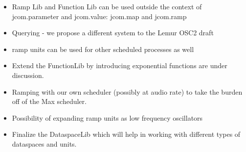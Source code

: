 \documentclass{article}
\begin{document}
\begin{itemize}
	\item Ramp Lib and Function Lib can be used outside the context of jcom.parameter and jcom.value: jcom.map and jcom.ramp
	\vspace{-8pt}
	\item Querying - we propose a different system to the Lemur OSC2 draft
	\vspace{-8pt}
	\item ramp units can be used for other scheduled processes as well
	\vspace{-8pt}
	\item Extend the FunctionLib by introducing exponential functions are under discussion. 
	\vspace{-8pt}
	\item Ramping with our own scheduler (possibly at audio rate) to take the burden off of the Max scheduler.
	\vspace{-8pt}
	\item Possibility of expanding ramp units as low frequency oscillators
	\vspace{-8pt}
	\item Finalize the DataspaceLib which will help in working with different types of dataspaces and units. 
	\vspace{-8pt}
\end{itemize}



\end{document}
